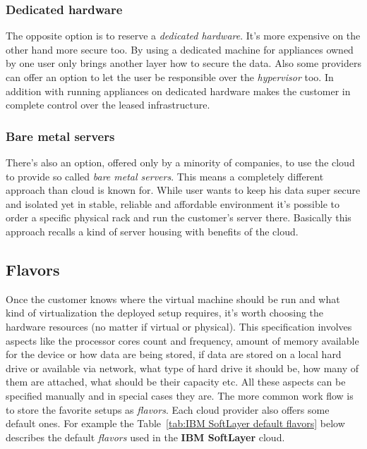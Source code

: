 \subsubsection{Dedicated hardware}
\label{subs:Dedicated hardware}

The opposite option is to reserve a \emph{dedicated hardware}. It's more expensive on the other hand more secure too. By using a dedicated machine for appliances owned by one user only brings another layer how to secure the data. Also some providers can offer an option to let the user be responsible over the \emph{hypervisor} too. In addition with running appliances on dedicated hardware makes the customer in complete control over the leased infrastructure.

\subsubsection{Bare metal servers}
\label{subs:Bare metal servers}

There's also an option, offered only by a minority of companies, to use the cloud to provide so called \emph{bare metal servers}. This means a completely different approach than cloud is known for. While user wants to keep his data super secure and isolated yet in stable, reliable and affordable environment it's possible to order a specific physical rack and run the customer's server there. Basically this approach recalls a kind of server housing with benefits of the cloud.

\subsection{Flavors}
\label{sub:Flavors}

Once the customer knows where the virtual machine should be run and what kind of virtualization the deployed setup requires, it's worth choosing the hardware resources (no matter if virtual or physical). This specification involves aspects like the processor cores count and frequency, amount of memory available for the device or how data are being stored, if data are stored on a local hard drive or available via network, what type of hard drive it should be, how many of them are attached, what should be their capacity etc. All these aspects can be specified manually and in special cases they are. The more common work flow is to store the favorite setups as \emph{flavors}. Each cloud provider also offers some default ones. For example the Table~\ref{tab:IBM SoftLayer default flavors} below describes the default \emph{flavors} used in the \textbf{IBM SoftLayer} cloud.

